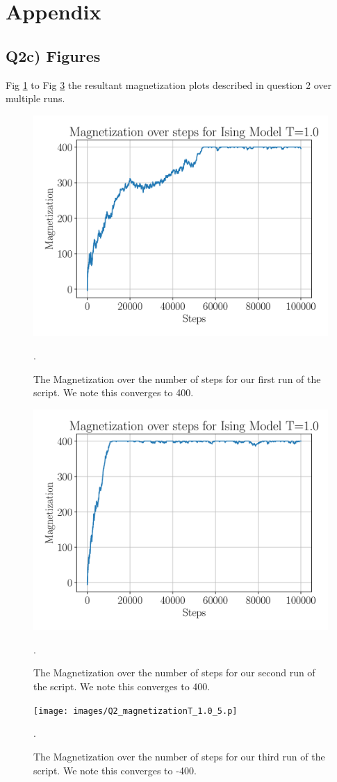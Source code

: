 \documentclass{article}
\begin{document}
\section*{Appendix}
\subsection*{Q2c) Figures}
Fig \ref{fig:q2d_magnet_1} to Fig \ref{fig:q2d_magnet_3} the resultant magnetization plots described in question 2 over multiple runs. 
\begin{figure}[H]
    \centerline{\includegraphics[scale=0.6]{images/Q2_magnetizationT_1.0_3.png}}
    \caption{The Magnetization over the number of steps for our first run of the script. We note this converges to 400.}.
    \label{fig:q2d_magnet_1}
\end{figure}
\begin{figure}[h!]
    \centerline{\includegraphics[scale=0.6]{images/Q2_magnetizationT_1.0_4.png}}
    \caption{The Magnetization over the number of steps for our second run of the script. We note this converges to 400.}.
    \label{fig:q2d_magnet_2}
\end{figure}
\begin{figure}[h!]
    \centerline{\texttt{[image: images/Q2\_magnetizationT\_1.0\_5.p]}}
    \caption{The Magnetization over the number of steps for our third run of the script. We note this converges to -400.}.
    \label{fig:q2d_magnet_3}
\end{figure}
\end{document}
